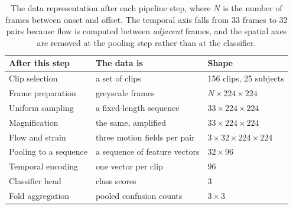 \begin{table}[H]
	\centering
	\small
	\begin{tabular}{@{}lll@{}}
		\hline
		\textbf{After this step} & \textbf{The data is} & \textbf{Shape} \\
		\hline
		Clip selection        & a set of clips                & 156 clips, 25 subjects \\
		Frame preparation     & greyscale frames              & $N \times 224 \times 224$ \\
		Uniform sampling      & a fixed-length sequence       & $33 \times 224 \times 224$ \\
		Magnification         & the same, amplified           & $33 \times 224 \times 224$ \\
		Flow and strain       & three motion fields per pair  & $3 \times 32 \times 224 \times 224$ \\
		Pooling to a sequence & a sequence of feature vectors & $32 \times 96$ \\
		Temporal encoding     & one vector per clip           & $96$ \\
		Classifier head       & class scores                  & $3$ \\
		Fold aggregation      & pooled confusion counts       & $3 \times 3$ \\
		\hline
	\end{tabular}
	\caption[What the data is at each pipeline step]{The data representation after each pipeline step, where $N$ is the number of frames between onset and offset. The temporal axis falls from 33 frames to 32 pairs because flow is computed between \emph{adjacent} frames, and the spatial axes are removed at the pooling step rather than at the classifier.}
	\label{tab:pipeline-shapes}
\end{table}

